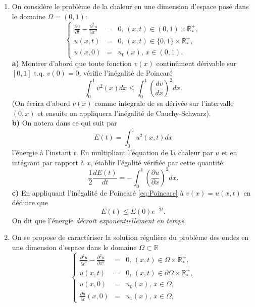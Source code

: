 \documentclass[12pt,a4paper]{article}
\begin{document}
\begin{enumerate}
\item
On consid\`ere le probl\`eme de la chaleur en une dimension
d'espace pos\'e dans le domaine $\Omega=(0,1)$:
\begin{equation}
\left\{\begin{array}{lcl}
\displaystyle\frac{\partial u}{\partial t} -  \frac{\partial^2 u}{\partial x^2}&=
&0,\,
(x,t)\in (0,1)\times\mathbb{R}_*^+,\\
u(x,t)&=&0,\, (x,t)\in \{0,1\}\times \mathbb{R}_*^+,\\
u(x,0)&=&u_0(x),\, x\in (0,1).
\end{array}\right.
\end{equation}
{\bf a)} Montrer d'abord que toute fonction $v(x)$ contin\^ument d\'erivable sur
$[0,1]$ t.q. $v(0)=0$, v\'erifie l'in\'egalit\'e de Poincar\'e
\begin{equation}\label{eq:Poincare}
\int_0^1 v^2(x)dx \le  \int_0^1\left(\frac{d v}{d
    x}\right)^2dx.
\end{equation}
(On \'ecrira d'abord $v(x)$ comme integrale de sa d\'eriv\'ee sur
l'intervalle $(0,x)$ et ensuite on appliquera l'in\'egalit\'e de Cauchy-Schwarz).\\
{\bf b)} On notera dans ce qui suit par 
$$E(t) = \int_0^1 u^2(x,t)dx$$
l'\'energie \`a l'instant $t$. En multipliant l'\'equation de la
chaleur par $u$ et
en int\'egrant par rapport \`a $x$, \'etablir l'\'egalit\'e
v\'erifi\'ee par cette quantit\'e:
$$
\frac{1}{2}\frac{dE(t)}{dt}
=-\int_0^1\left(\frac{\partial u}{\partial x}\right)^2 dx.
$$
{\bf c)} En appliquant l'in\'egalit\'e de Poincar\'e \eqref{eq:Poincare} \`a $v(x)= u(x,t)$ en
d\'eduire que
$$
E(t) \le E(0)e^{-2t}.
$$
On dit que l'\'energie {\it d\'ecro\^it exponentiellement en temps}.
\item 
On se propose de caract\'eriser la solution r\'eguli\`ere du
probl\`eme des ondes en une dimension d'espace dans le domaine $\Omega\subset \mathbb{R}$
\begin{equation}
\left\{\begin{array}{lcl}
\displaystyle\frac{\partial^2 u}{\partial t^2} -  \frac{\partial^2 u}{\partial x^2} &= &0,\,
(x,t)\in\Omega\times\mathbb{R}_*^+,\\
u(x,t)&=&0,\,(x,t)\in\partial\Omega\times \mathbb{R}_*^+,\\
u(x,0)&=&u_0(x),\, x\in\Omega,\\
\frac{\partial u}{\partial t}(x,0)& = & u_1(x),\, x\in \Omega,
\end{array}\right.

\end{equation}
\end{enumerate}
\end{document}

